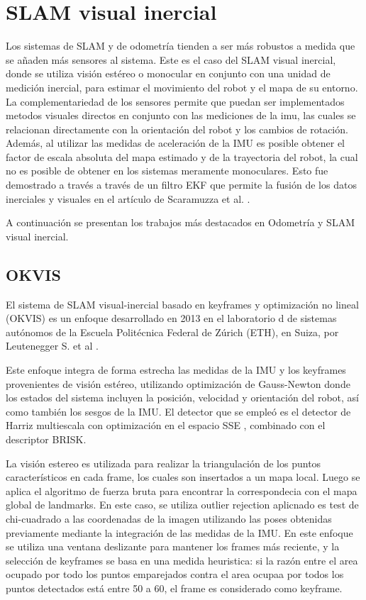 \section{SLAM visual inercial}

Los sistemas de SLAM y de odometría tienden a ser más robustos a medida que se añaden más sensores al sistema. Este es el caso del SLAM visual inercial, donde se utiliza visión estéreo o monocular en conjunto con una unidad de medición inercial, para estimar el movimiento del robot y el mapa de su entorno.  La complementariedad de los sensores permite que puedan ser implementados metodos visuales directos en conjunto con las mediciones de la imu, las cuales se relacionan directamente con la orientación del robot y los cambios de rotación. Además, al utilizar las medidas de aceleración de la IMU es posible obtener el factor de escala absoluta  del mapa estimado y de la trayectoria del robot, la cual no es posible de obtener en los sistemas meramente monoculares. Esto fue demostrado a través a través de un filtro EKF que permite la fusión de los datos inerciales y visuales en el artículo de  Scaramuzza et al. \cite{scaramuzza}.

A continuación se presentan los trabajos más destacados en Odometría y SLAM visual inercial.

\subsection{OKVIS}

El sistema de SLAM visual-inercial basado en keyframes y optimización no lineal (OKVIS)  es un enfoque desarrollado en 2013 en el laboratorio d de sistemas autónomos de la Escuela Politécnica Federal de Zúrich (ETH), en Suiza, por  Leutenegger S. et al \cite{okvis}.


Este enfoque integra de forma estrecha las medidas de la IMU y los keyframes provenientes de visión estéreo, utilizando optimización de Gauss-Newton donde los estados del sistema incluyen la posición, velocidad y orientación del robot, así como también los sesgos de la IMU. El detector que se empleó es el detector de Harriz multiescala con optimización en el espacio SSE , combinado con el descriptor BRISK. 

La visión estereo es utilizada para realizar la triangulación de los puntos característicos en cada frame, los cuales son insertados a un mapa local. Luego se aplica el algoritmo de fuerza bruta para encontrar la correspondecia con el mapa global de landmarks. En este caso, se utiliza outlier rejection aplicnado es test de chi-cuadrado a las coordenadas de la imagen utilizando las poses obtenidas previamente mediante la integración de las medidas de la IMU.
En este enfoque se utiliza una ventana deslizante para mantener los frames más reciente, y la selección de keyframes se basa en una medida heuristica: si la razón entre el area ocupado por todo los puntos emparejados contra el area ocupaa por todos los puntos detectados está entre 50 a 60, el frame es considerado como keyframe.

